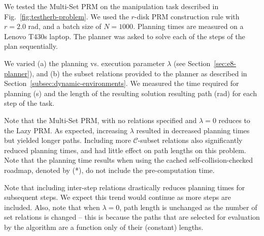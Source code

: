 We tested the Multi-Set PRM on the manipulation task
described in Fig.~\ref{fig:testherb-problem}.
We used the $r$-disk PRM construction rule with $r=2.0$ rad,
and a batch size of $N=1000$.
Planning times are measured on a Lenovo T430s laptop.
The planner was asked to solve each of the steps of the plan
sequentially.

We varied
(a) the planning vs. execution parameter $\lambda$
(see Section~\ref{sec:e8-planner}), and
(b) the subset relations provided to the planner
as described in Section~\ref{subsec:dynamic-environments}.
We measured the time required for planning (s)
and the length of the resulting solution resulting path (rad)
for each step of the task.

Note that the Multi-Set PRM,
with no relations specified and $\lambda=0$
reduces to the Lazy PRM.
As expected,
increasing $\lambda$ resulted in decreased planning times
but yielded longer paths.
Including more $\mathcal{C}$-subset relations
also significantly reduced planning times,
and had little effect on path lengths on this problem.
Note that the planning time results when using
the cached self-collision-checked roadmap, denoted by (*),
do not include the pre-computation time.

Note that including inter-step relations drastically
reduces planning times for subsequent steps.
We expect this trend would continue as more steps are included.
Also, note that when $\lambda=0$,
path length is unchanged as the number of set relations is
changed
-- this is because the paths that are selected for evaluation
by the algorithm are a function only of their (constant) lengths.

%


